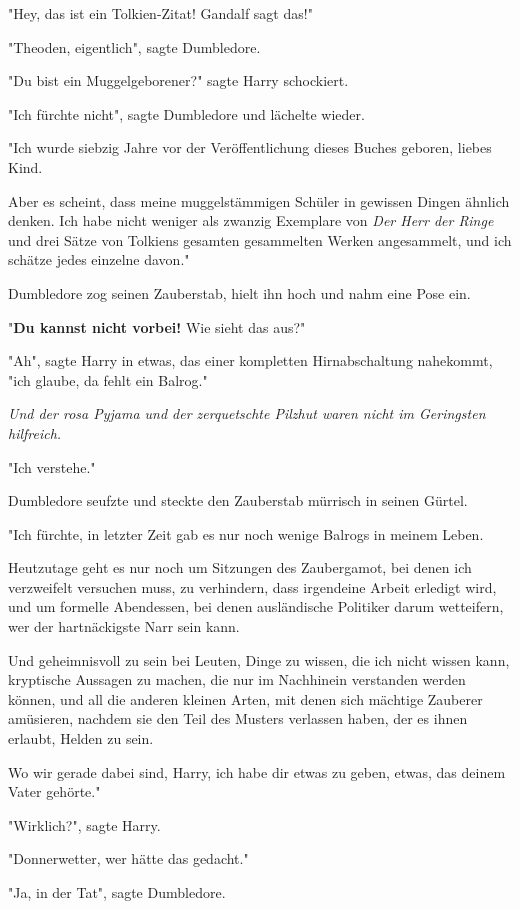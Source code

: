 {"Hey, das ist ein Tolkien-Zitat! Gandalf sagt das!"

"Theoden, eigentlich", sagte Dumbledore.

"Du bist ein Muggelgeborener?" sagte Harry schockiert.

"Ich fürchte nicht", sagte Dumbledore und lächelte wieder.

"Ich wurde siebzig Jahre vor der Veröffentlichung dieses Buches geboren, liebes Kind.

Aber es scheint, dass meine muggelstämmigen Schüler in gewissen Dingen ähnlich denken. Ich habe nicht weniger als zwanzig Exemplare von \emph{Der Herr der Ringe} und drei Sätze von Tolkiens gesamten gesammelten Werken angesammelt, und ich schätze jedes einzelne davon."

Dumbledore zog seinen Zauberstab, hielt ihn hoch und nahm eine Pose ein.

"\textbf{Du kannst nicht vorbei!} Wie sieht das aus?"

"Ah", sagte Harry in etwas, das einer kompletten Hirnabschaltung nahekommt, "ich glaube, da fehlt ein Balrog."

\emph{Und der rosa Pyjama und der zerquetschte Pilzhut waren nicht im Geringsten hilfreich.}

"Ich verstehe."

Dumbledore seufzte und steckte den Zauberstab mürrisch in seinen Gürtel.

"Ich fürchte, in letzter Zeit gab es nur noch wenige Balrogs in meinem Leben.

Heutzutage geht es nur noch um Sitzungen des Zaubergamot, bei denen ich verzweifelt versuchen muss, zu verhindern, dass irgendeine Arbeit erledigt wird, und um formelle Abendessen, bei denen ausländische Politiker darum wetteifern, wer der hartnäckigste Narr sein kann.

Und geheimnisvoll zu sein bei Leuten, Dinge zu wissen, die ich nicht wissen kann, kryptische Aussagen zu machen, die nur im Nachhinein verstanden werden können, und all die anderen kleinen Arten, mit denen sich mächtige Zauberer amüsieren, nachdem sie den Teil des Musters verlassen haben, der es ihnen erlaubt, Helden zu sein.

Wo wir gerade dabei sind, Harry, ich habe dir etwas zu geben, etwas, das deinem Vater gehörte."

"Wirklich?", sagte Harry.

"Donnerwetter, wer hätte das gedacht."

"Ja, in der Tat", sagte Dumbledore.

}
